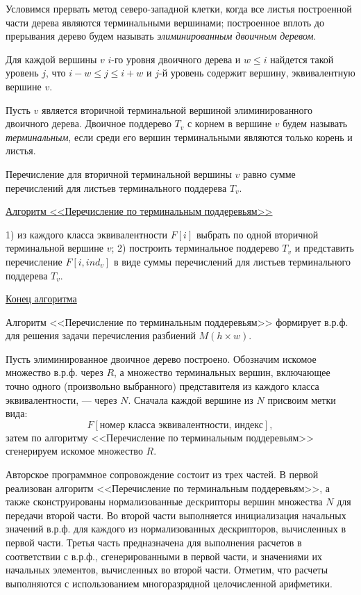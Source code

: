 Условимся прервать метод северо-западной клетки, когда все листья построенной части дерева являются терминальными вершинами; построенное вплоть до прерывания дерево будем называть \textit{ элиминированным двоичным деревом}.

\begin{statement} \label{akm1the3}
Для каждой вершины $v$  $i$-го уровня двоичного дерева и ${w\leq i}$ найдется такой уровень $j$, что  $i-w\leq j\leq i+w$ и $j$-й уровень содержит вершину, эквивалентную вершине $v$.
\end{statement} 

Пусть $v$ является вторичной терминальной вершиной элиминированного двоичного дерева. Двоичное поддерево $T_v$   с корнем в вершине $v$ будем называть \textit{ терминальным}, если среди его вершин терминальными являются только корень и листья.

\begin{statement} \label{akm1the4}
Перечисление для вторичной терминальной вершины $v$ равно сумме перечислений для листьев терминального поддерева $T_v$.
\end{statement} 

\underline{Алгоритм <<Перечисление по терминальным поддеревьям>>}

1) из каждого класса эквивалентности $F[i]$ выбрать по одной вторичной терминальной вершине $v$;
2) построить терминальное поддерево $T_v$  и представить перечисление $F[i,ind_v]$ в виде суммы перечислений для листьев терминального поддерева $T_v$.

\underline{Конец алгоритма}

\begin{statement} \label{akm1the5}
Алгоритм <<Перечисление по терминальным поддеревьям>> формирует в.р.ф. для решения задачи перечисления разбиений $M(h\times w)$.
\end{statement} 

Пусть элиминированное двоичное дерево построено. Обозначим искомое множество в.р.ф. через $R$, а множество терминальных вершин, включающее точно одного (произвольно выбранного) представителя из каждого класса эквивалентности, --- через $N$. Сначала каждой вершине из $N$ присвоим метки вида:
$$F[\text{номер класса эквивалентности, индекс}],$$
затем по алгоритму <<Перечисление по терминальным поддеревьям>> сгенерируем искомое множество $R$.

Авторское программное сопровождение состоит из трех частей. В первой реализован алгоритм <<Перечисление по терминальным поддеревьям>>, а также сконструированы нормализованные дескрипторы вершин множества $N$ для передачи второй части. Во второй части выполняется инициализация начальных значений в.р.ф. для каждого из нормализованных дескрипторов, вычисленных в первой части. Третья часть предназначена для выполнения расчетов в соответствии с в.р.ф., сгенерированными в первой части, и значениями их начальных элементов, вычисленных во второй части. Отметим, что расчеты выполняются с использованием многоразрядной целочисленной арифметики.

